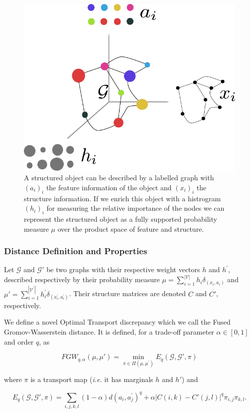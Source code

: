 \begin{figure}
\centering
\includegraphics[width=.4\textwidth]{fig/graph_as_distrib}
\caption{A structured object can be described by a labelled graph with
$(a_{i})_{i}$ the feature information of the object and $(x_{i})_{i}$ the
structure information.
If we enrich this object with a histrogram $(h_{i})_{i}$ for measuring the
relative importance of the nodes we can represent the structured object as a
fully supported probability measure $\mu$ over the product space of feature
and structure. \label{fig:graph}}
\end{figure}

\subsubsection{Distance Definition and Properties}

Let $\mathcal{G}$ and $\mathcal{G}'$ be two graphs with their respective weight
vectors $h$ and $h^\prime$, described respectively
by their probability measure
$\mu= \sum_{i=1}^{|\mathcal{V}|} h_{i} \delta_{(x_{i},a_{i})}$
and $\mu' = \sum_{i=1}^{|\mathcal{V}^\prime|} h^\prime_i \delta_{(x^\prime_i,a^\prime_i)}$.
Their structure matrices are denoted $C$ and $C'$, respectively.


We define a novel Optimal Transport discrepancy which we call the
Fused Gromov-Wasserstein distance.
It is defined, for a trade-off parameter  $\alpha \in [0,1]$ and order $q$, as

\begin{equation}
\label{discretefgw}
FGW_{q, \alpha} (\mu, \mu') = \min_{\pi \in \Pi(\mu, \mu^\prime)}
    E_{q}(\mathcal{G}, \mathcal{G}', \pi)
\end{equation}

where $\pi$ is a transport map (\emph{i.e.} it has marginals $h$ and $h'$) and

\begin{equation}
E_{q}(\mathcal{G}, \mathcal{G}', \pi) =
    \sum_{i,j,k,l} (1-\alpha) d(a_{i},a^\prime_j)^{q}
                    +\alpha |C(i,k)-C'(j,l)|^{q} \pi_{i,j}\pi_{k,l} .
\end{equation}

